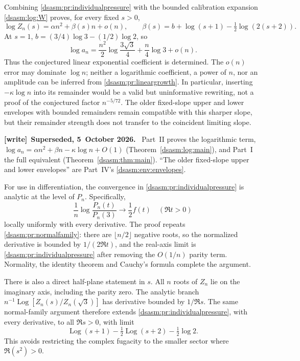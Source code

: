 \documentclass[11pt,letterpaper]{article}
\theoremstyle{remark}\newtheorem{remark}[theorem]{Remark}
\newenvironment{writenote}[1][]{\par\smallskip\begingroup\small
 \noindent\textbf{[write]}\if\relax\detokenize{#1}\relax\else~\textbf{#1.}\fi\ }%
 {\par\endgroup\smallskip}
\begin{document}
Combining \eqref{dsasm:pr:individualpressure} with the bounded calibration
expansion \eqref{dsasm:log:W} proves, for every fixed $s>0$,
\begin{equation}\label{dsasm:pr:freeenergy}
 \log Z_n(s)=\alpha n^2+\beta(s)n+o(n),\qquad
 \beta(s)=b+\log(s+1)-\tfrac12\log(2(s+2)).
\end{equation}
At $s=1$, $b=(3/4)\log3-(1/2)\log2$, so
\begin{equation}\label{dsasm:pr:lineargrowth}
 \boxed{\displaystyle
 \log a_n=\frac{n^2}{2}\log\frac{3\sqrt3}{4}
                 +\frac n4\log3+o(n).}
\end{equation}
Thus the conjectured linear exponential coefficient is determined.
The $o(n)$ error may dominate $\log n$; neither a logarithmic
coefficient, a power of $n$, nor an amplitude can be inferred from
\eqref{dsasm:pr:lineargrowth}. In particular, inserting $-\kappa\log n$ into
its remainder would be a valid but uninformative rewriting, not a
proof of the conjectured factor $n^{-5/72}$. The older fixed-slope
upper and lower envelopes with bounded remainders remain compatible
with this sharper slope, but their remainder strength does not
transfer to the coincident limiting slope.
\begin{writenote}[Superseded, 5~October 2026]
Part~II proves the logarithmic term, $\log a_n=\alpha n^2+\beta n-\kappa\log n+O(1)$ (Theorem~\ref{dsasm:log:main}), and Part~I the full equivalent (Theorem~\ref{dsasm:thm:main}). ``The older fixed-slope upper and lower envelopes'' are Part~IV's \eqref{dsasm:env:envelopes}.
\end{writenote}


For use in differentiation, the convergence in
\eqref{dsasm:pr:individualpressure} is analytic at the level of $P_n$.
Specifically,
\begin{equation}\label{dsasm:pr:individualanalytic}
 \frac1n\log\frac{P_n(t)}{P_n(3)}\longrightarrow\frac12f(t)
 \quad(\Re t>0)
\end{equation}
locally uniformly with every derivative. The proof repeats
\eqref{dsasm:pr:normalfamily}: there are $\lfloor n/2\rfloor$ negative roots,
so the normalized derivative is bounded by $1/(2\Re t)$, and the
real-axis limit is \eqref{dsasm:pr:individualpressure} after removing the
$O(1/n)$ parity term. Normality, the identity theorem and Cauchy's
formula complete the argument.

There is also a direct half-plane statement in $s$. All $n$ roots of
$Z_n$ lie on the imaginary axis, including the parity zero. The
analytic branch $n^{-1}\operatorname{Log}[Z_n(s)/Z_n(\sqrt3)]$ has
derivative bounded by $1/\Re s$. The same normal-family argument
therefore extends \eqref{dsasm:pr:individualpressure}, with every derivative,
to all $\Re s>0$, with limit
\[
 \operatorname{Log}(s+1)-\tfrac12\operatorname{Log}(s+2)-\tfrac12\log2.
\]
This avoids restricting the complex fugacity to the smaller sector
where $\Re(s^2)>0$.
\end{document}
